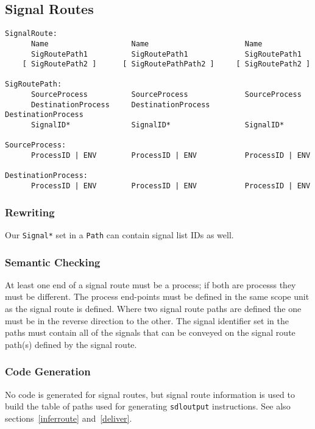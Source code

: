 \subsection{Signal Routes}

\begin{verbatim}
SignalRoute:
      Name                   Name                      Name
      SigRoutePath1          SigRoutePath1             SigRoutePath1
    [ SigRoutePath2 ]      [ SigRoutePathPath2 ]     [ SigRoutePath2 ]

SigRoutePath:
      SourceProcess          SourceProcess             SourceProcess
      DestinationProcess     DestinationProcess        DestinationProcess
      SignalID*              SignalID*                 SignalID*

SourceProcess:
      ProcessID | ENV        ProcessID | ENV           ProcessID | ENV

DestinationProcess:
      ProcessID | ENV        ProcessID | ENV           ProcessID | ENV
\end{verbatim}

\subsubsection{Rewriting}

Our {\tt Signal*} set in a {\tt Path} can contain signal list IDs as well.

\subsubsection{Semantic Checking}

At least one end of a signal route must be a process; if both are processs
they must be different.
The process end-points must be defined in the same scope unit as the
signal route is defined.
Where two signal route paths are defined the one must be in the
reverse direction to the other.
The signal identifier set in the paths must contain all of the
signals that can be conveyed on the signal route path(s) defined by the
signal route.

\subsubsection{Code Generation}

No code is generated for signal routes, but signal route information is used
to build the table of paths used for generating {\tt sdloutput}
instructions. See also sections~\ref{inferroute} and~\ref{deliver}.

